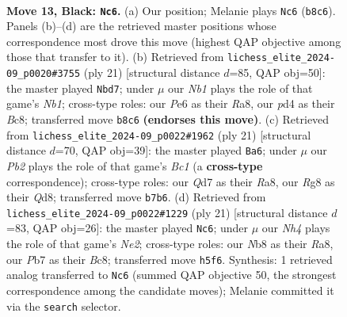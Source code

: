 \documentclass[11pt]{article}
\begin{document}
\clearpage

\begin{figure}[p]\centering
\begin{subfigure}{0.46\textwidth}\centering
\resizebox{\linewidth}{!}{%
\newchessgame
\chessboard[
  setfen={rnb2kr1/1p1qbp1p/p3p1p1/2Pp3n/3P4/1N6/PP2NPPP/1RBQKB1R b - - 3 13},
  showmover=false,
  pgfstyle=straightmove, color=movearrow, markmove={b8-c6}
]}
\caption{}
\end{subfigure}\hfill
\begin{subfigure}{0.46\textwidth}\centering
\resizebox{\linewidth}{!}{%
\newchessgame
\chessboard[
  setfen={rnbqr1k1/1p3pbp/p2p1np1/2pP4/P3P3/2N5/1P1NBPPP/R1BQK2R b KQ - 0 11},
  showmover=false,
  pgfstyle=straightmove, color=movearrow, markmove={b8-d7}
]}
\caption{}
\end{subfigure}
\\[4pt]
\begin{subfigure}{0.46\textwidth}\centering
\resizebox{\linewidth}{!}{%
\newchessgame
\chessboard[
  setfen={r1bqkbnr/6pp/2n1p3/p2pPp2/Pp1P4/5N2/1P1N1PPP/R1BQKB1R b KQkq - 1 11},
  showmover=false,
  pgfstyle=straightmove, color=movearrow, markmove={c8-a6}
]}
\caption{}
\end{subfigure}\hfill
\begin{subfigure}{0.46\textwidth}\centering
\resizebox{\linewidth}{!}{%
\newchessgame
\chessboard[
  setfen={r1bq1rk1/ppp1npp1/1b1p1n1p/8/3PP3/3B1N2/PP2NPPP/R1BQ1RK1 b - - 2 11},
  showmover=false,
  pgfstyle=straightmove, color=movearrow, markmove={e7-c6}
]}
\caption{}
\end{subfigure}
\caption{\textbf{Move 13, Black: \texttt{Nc6}.} (a) Our position; Melanie plays \texttt{Nc6} (\texttt{b8c6}). Panels (b)--(d) are the retrieved master positions whose correspondence most drove this move (highest QAP objective among those that transfer to it). (b) Retrieved from \texttt{lichess\_elite\_2024-09\_p0020\#3755} (ply 21) [structural distance $d$=85, QAP obj=50]: the master played \texttt{Nbd7}; under $\mu$ our \emph{Nb1} plays the role of that game's \emph{Nb1}; cross-type roles: our \emph{P}e6 as their \emph{R}a8, our \emph{p}d4 as their \emph{B}c8; transferred move \texttt{b8c6} \textbf{(endorses this move)}. (c) Retrieved from \texttt{lichess\_elite\_2024-09\_p0022\#1962} (ply 21) [structural distance $d$=70, QAP obj=39]: the master played \texttt{Ba6}; under $\mu$ our \emph{Pb2} plays the role of that game's \emph{Bc1} (a \textbf{cross-type} correspondence); cross-type roles: our \emph{Q}d7 as their \emph{R}a8, our \emph{R}g8 as their \emph{Q}d8; transferred move \texttt{b7b6}. (d) Retrieved from \texttt{lichess\_elite\_2024-09\_p0022\#1229} (ply 21) [structural distance $d$=83, QAP obj=26]: the master played \texttt{Nc6}; under $\mu$ our \emph{Nh4} plays the role of that game's \emph{Ne2}; cross-type roles: our \emph{N}b8 as their \emph{R}a8, our \emph{P}b7 as their \emph{B}c8; transferred move \texttt{h5f6}. Synthesis: 1 retrieved analog transferred to \texttt{Nc6} (summed QAP objective 50, the strongest correspondence among the candidate moves); Melanie committed it via the \texttt{search} selector.}
\label{fig:thought-m25}
\end{figure}
\end{document}
